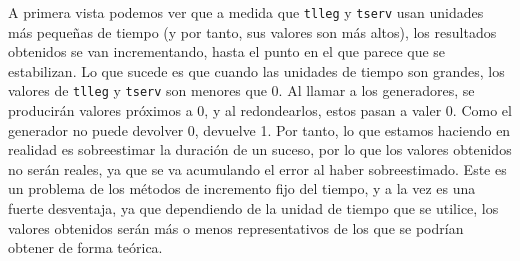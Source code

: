 \documentclass[11pt,a4paper]{article}
\begin{document}
\begin{table}[H]
\caption{Resultados obtenidos por el incremento de tiempo fijo.}
\label{tab:fijo}
\end{table}

A primera vista podemos ver que a medida que \texttt{tlleg} y \texttt{tserv}
usan unidades más pequeñas de tiempo (y por tanto, sus valores son más altos),
los resultados obtenidos se van incrementando, hasta el punto en el que parece
que se estabilizan. Lo que sucede es que cuando las unidades de tiempo son grandes,
los valores de \texttt{tlleg} y \texttt{tserv} son menores que 0. Al llamar a
los generadores, se producirán valores próximos a 0, y al redondearlos, estos pasan
a valer 0. Como el generador no puede devolver 0, devuelve 1. Por tanto, lo que
estamos haciendo en realidad es sobreestimar la duración de un suceso, por lo que
los valores obtenidos no serán reales, ya que se va acumulando el error al haber
sobreestimado. Este es un problema de los métodos de incremento fijo del tiempo, y
a la vez es una fuerte desventaja, ya que dependiendo de la unidad de tiempo que se
utilice, los valores obtenidos serán más o menos representativos de los que se podrían
obtener de forma teórica.
\end{document}
